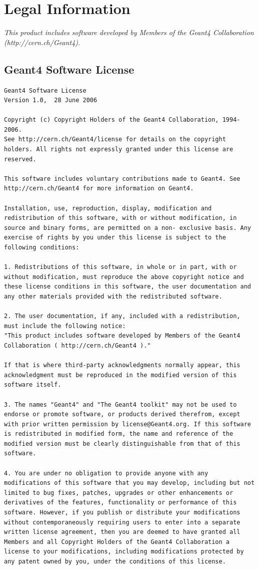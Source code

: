 \documentclass[12pt]{article}
\begin{document}
\section{Legal Information}	%
\emph{This product includes software developed by Members of the Geant4 Collaboration (http://cern.ch/Geant4).}

\subsection{Geant4 Software License}
\begin{lstlisting}
Geant4 Software License
Version 1.0,  28 June 2006
 
Copyright (c) Copyright Holders of the Geant4 Collaboration, 1994-2006.
See http://cern.ch/Geant4/license for details on the copyright holders. All rights not expressly granted under this license are reserved.

This software includes voluntary contributions made to Geant4. See http://cern.ch/Geant4 for more information on Geant4.

Installation, use, reproduction, display, modification and redistribution of this software, with or without modification, in source and binary forms, are permitted on a non- exclusive basis. Any exercise of rights by you under this license is subject to the following conditions:

1. Redistributions of this software, in whole or in part, with or without modification, must reproduce the above copyright notice and these license conditions in this software, the user documentation and any other materials provided with the redistributed software.

2. The user documentation, if any, included with a redistribution, must include the following notice:
"This product includes software developed by Members of the Geant4 Collaboration ( http://cern.ch/Geant4 )."

If that is where third-party acknowledgments normally appear, this acknowledgment must be reproduced in the modified version of this software itself.

3. The names "Geant4" and "The Geant4 toolkit" may not be used to endorse or promote software, or products derived therefrom, except with prior written permission by license@Geant4.org. If this software is redistributed in modified form, the name and reference of the modified version must be clearly distinguishable from that of this software.

4. You are under no obligation to provide anyone with any modifications of this software that you may develop, including but not limited to bug fixes, patches, upgrades or other enhancements or derivatives of the features, functionality or performance of this software. However, if you publish or distribute your modifications without contemporaneously requiring users to enter into a separate written license agreement, then you are deemed to have granted all Members and all Copyright Holders of the Geant4 Collaboration a license to your modifications, including modifications protected by any patent owned by you, under the conditions of this license.


\end{lstlisting}
\end{document}
